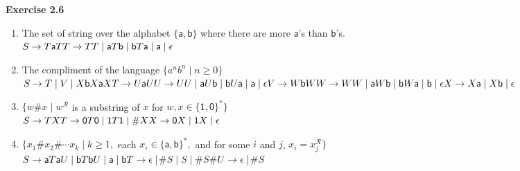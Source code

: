 \documentclass{article}
\makeatletter
\newcommand{\rev}{^{\scriptscriptstyle\mathcal{R}}}
\newcommand\exercise[1]{\par\vspace{4ex}\normalfont\normalsize\noindent
\textbf{\large Exercise #1}\par\nobreak\@afterindentfalse\@afterheading}
\makeatother
\begin{document}
\exercise{2.6}
\begin{enumerate}
	\item The set of string over the alphabet $\{\textsf{a}, \textsf{b}\}$ where there are more $\textsf{a}$'s than $\textsf{b}$'s.\\
	$S \rightarrow T\textsf{a}T \\ T \rightarrow TT \mid \textsf{a}T\textsf{b} \mid \textsf{b}T\textsf{a} \mid \textsf{a} \mid \epsilon$
	\item The compliment of the language $\{a^nb^n \mid n \geq 0\}$\\
	$S \rightarrow T \mid V \mid X\textsf{b}X\textsf{a}X \\
	T \rightarrow U\textsf{a}U \\
	U \rightarrow UU \mid \textsf{a}U\textsf{b} \mid \textsf{b}U\textsf{a} \mid \textsf{a} \mid \epsilon \\
	V \rightarrow W\textsf{b}W \\
	W \rightarrow WW \mid \textsf{a}W\textsf{b} \mid \textsf{b}W\textsf{a} \mid \textsf{b} \mid \epsilon \\
	X \rightarrow X\textsf{a} \mid X\textsf{b} \mid \epsilon$
	\item$\{w\textsf{\#}x \mid w\rev$ is a substring of $x$ for $w,x \in \{\textsf{1}, \textsf{0}\}^{*}\}$\\
	$S \rightarrow TX \\ T \rightarrow \textsf{0}T\textsf{0} \mid \textsf{1}T\textsf{1} \mid \textsf{\#}X \\ X \rightarrow \textsf{0}X \mid \textsf{1}X \mid \epsilon$
	\item $\{x_1\textsf{\#}x_2\textsf{\#}\cdots x_k \mid k \geq 1,$ each $x_i \in \{\textsf{a},\textsf{b}\}^{*},$ and for some $i$ and $j$, $x_i=x_j\rev \}$ \\
	$S \rightarrow \textsf{a}T\textsf{a}U \mid \textsf{b}T\textsf{b}U \mid \textsf{a} \mid \textsf{b} \\
	T \rightarrow \epsilon \mid $\#$S \mid S \mid $\#$S$\#$ \\
	U \rightarrow \epsilon \mid $\#$S$
\end{enumerate}
\end{document}
